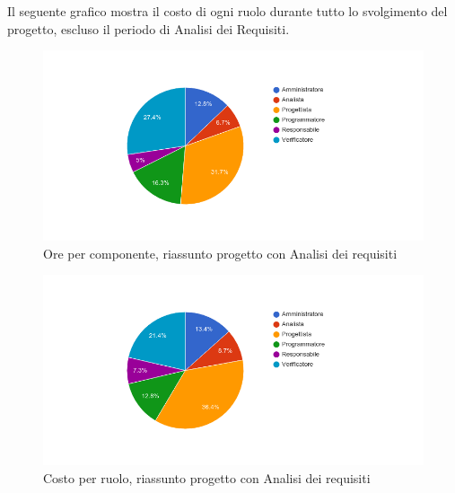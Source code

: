 Il seguente grafico mostra il costo di ogni ruolo durante tutto lo svolgimento del progetto, escluso il periodo di Analisi dei Requisiti.

\begin{figure}[H]
  \begin{center}
    \includegraphics[width=15cm]{res/img/prospettoEconomico/orePerRuoloRiassuntoConAnalisi.png}
  \caption{Ore per componente, riassunto progetto con Analisi dei requisiti}
  \end{center} 
\end{figure}  

\begin{figure}[H]
  \begin{center}
    \includegraphics[width=15cm]{res/img/prospettoEconomico/costoPerRuoloRiassuntoConAnalisi.png}
  \caption{Costo per ruolo, riassunto progetto con Analisi dei requisiti}
  \end{center} 
\end{figure}  


